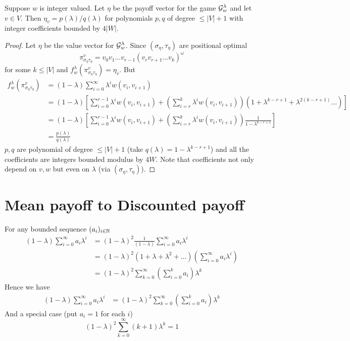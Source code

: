 \begin{corollary}
    \label{cor:disc-value-bounds}
    Suppose $w$ is integer valued. Let $\eta$ be the payoff vector for the game $\mathcal{G}^\lambda_w$ and let $v \in V$.
    Then $\eta_v = p(\lambda)/q(\lambda)$ for polynomials $p,q$  of degree $\leq |V|+1$ with integer coefficients bounded by $4|W|$.
\end{corollary}
\begin{proof}
    Let $\eta$ be the value vector for $\mathcal{G}^\lambda_w$. Since $(\sigma_\eta,\tau_\eta)$ are positional optimal
    \[
        \pi^v_{\sigma_\eta\tau_\eta}=v_0v_1 \ldots v_{r-1} (v_r v_{r+1} \ldots v_k)^\omega
    \] for some $k \leq |V|$ and $f^\lambda_w(\pi^v_{\sigma_\eta\tau_\eta})=\eta_v$. But
    \begin{align*}
        f^\lambda_w(\pi^v_{\sigma_\eta\tau_\eta}) &= (1-\lambda) \sum_{i=0}^\infty \lambda^i w(v_i,v_{i+1})\\
        &= (1-\lambda) \left[ \sum_{i=0}^{r-1} \lambda^i w(v_i,v_{i+1}) + \left( \sum_{i=r}^k \lambda^i w(v_i,v_{i+1}) \right) (1+\lambda^{k-r+1}+\lambda^{2(k-r+1)} \ldots) \right]\\
        &= (1-\lambda) \left[ \sum_{i=0}^{r-1} \lambda^i w(v_i,v_{i+1}) + \left( \sum_{i=r}^k \lambda^i w(v_i,v_{i+1}) \right) \frac{1}{1- \lambda^{k-r+1}} \right]\\
        &= \frac{p(\lambda)}{q(\lambda)}
    \end{align*}
    $p,q$ are polynomial of degree $\leq |V|+1$ (take $q(\lambda)=1-\lambda^{k-r+1}$) and all the coefficients are integers bounded modulus by $4W$. Note that coefficients not only depend on $v,w$ but even on $\lambda$ (via $(\sigma_\eta,\tau_\eta)$).
\end{proof}

\section{Mean payoff to Discounted payoff}

For any bounded sequence $(a_i)_{i \in \mathbb{N}}$
\begin{align*}
    (1-\lambda) \sum_{i=0}^\infty a_i \lambda^i  &= (1-\lambda)^2 \frac{1}{(1-\lambda)} \sum_{i=0}^\infty a_i\lambda^i\\
    &= (1-\lambda)^2 (1+\lambda+\lambda^2+\ldots) (\sum_{i=0}^\infty a_i \lambda^i)\\
    &= (1-\lambda)^2 \sum_{k=0}^\infty \left(\sum_{i=0}^k a_i\right) \lambda^k
\end{align*}
Hence we have
\begin{align}
    (1-\lambda)\sum_{i=0}^\infty a_i\lambda^i &= (1-\lambda)^2\sum_{k=0}^\infty \left(\sum_{i=0}^k a_i\right) \lambda^k \label{eq:disc-to-sum}
\end{align}
And a special case (put $a_i = 1$ for each $i$)
\begin{equation}
    (1-\lambda)^2 \sum_{k=0}^\infty (k+1)\lambda^k = 1 \label{eq:series}
\end{equation}

